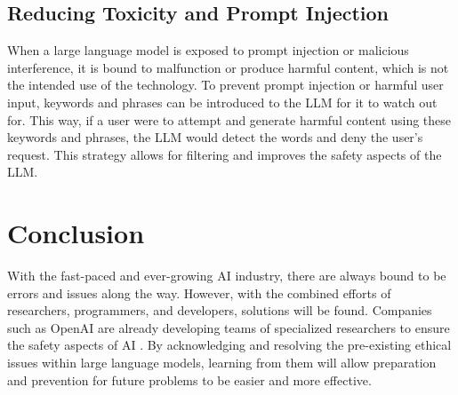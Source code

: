 \documentclass[12pt]{extarticle}
\begin{document}
\subsection{Reducing Toxicity and Prompt Injection}
When a large language model is exposed to prompt injection or malicious interference, it is bound to malfunction or produce harmful content, which is not the intended use of the technology. To prevent prompt injection or harmful user input, keywords and phrases can be introduced to the LLM for it to watch out for. This way, if a user were to attempt and generate harmful content using these keywords and phrases, the LLM would detect the words and deny the user's request. This strategy allows for filtering and improves the safety aspects of the LLM.

\section{Conclusion}
\label{conclusion}
With the fast-paced and ever-growing AI industry, there are always bound to be errors and issues along the way. However, with the combined efforts of researchers, programmers, and developers, solutions will be found. Companies such as OpenAI are already developing teams of specialized researchers to ensure the safety aspects of AI \cite{openaiteam}. By acknowledging and resolving the pre-existing ethical issues within large language models, learning from them will allow preparation and prevention for future problems to be easier and more effective. 




\end{document}

